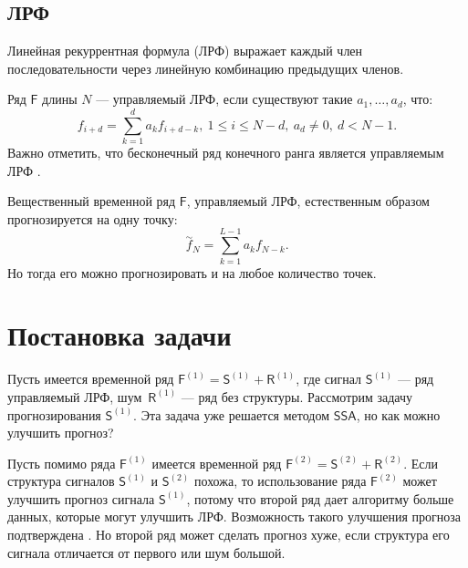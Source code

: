 \documentclass[specialist, substylefile = spbureport.rtx,
    subf,href,colorlinks=true, 12pt]{disser}
\newcommand{\F}{\mathsf{F}}
\newcommand{\sfS}{\mathsf{S}}
\newcommand{\sfR}{\mathsf{R}}
\newcommand{\SSA}{\mathsf{SSA}}
\begin{document}
    \section{ЛРФ}
        Линейная рекуррентная формула (ЛРФ) выражает каждый член последовательности через линейную комбинацию предыдущих членов.

        Ряд $\F$ длины $N$ --- управляемый ЛРФ, если существуют такие $a_1, \dotso, a_d$, что:
        $$f_{i+d} = \sum_{k=1}^d a_k f_{i+d-k},\ 1 \leq i \leq N - d,\ a_d \neq 0,\ d < N - 1.$$
        Важно отметить, что бесконечный ряд конечного ранга является управляемым ЛРФ \cite[раздел 2.1.2.2, стр. 35]{SSA_with_R}.
        
        

        Вещественный временной ряд $\F$, управляемый ЛРФ, естественным образом прогнозируется на одну точку:
        $$\overset{\sim}{f}_{N} = \sum_{k=1}^{L-1} a_k f_{N-k}.$$
        Но тогда его можно прогнозировать и на любое количество точек.




    \chapter{Постановка задачи}

        Пусть имеется временной ряд $\F^{(1)} = \sfS^{(1)} + \sfR^{(1)}$, где сигнал $\sfS^{(1)}$ --- ряд управляемый ЛРФ, шум~$\sfR^{(1)}$ --- ряд без структуры. Рассмотрим задачу прогнозирования $\sfS^{(1)}$. Эта задача уже решается методом $\SSA$, но как можно улучшить прогноз?

        Пусть помимо ряда $\F^{(1)}$ имеется временной ряд $\F^{(2)} = \sfS^{(2)} + \sfR^{(2)}$.
        Если структура сигналов $\sfS^{(1)}$ и $\sfS^{(2)}$ похожа, то использование ряда $\F^{(2)}$ может улучшить прогноз сигнала $\sfS^{(1)}$, потому что второй ряд дает алгоритму больше данных, которые могут улучшить ЛРФ.
        Возможность такого улучшения прогноза подтверждена \cite[4.3.3.3, стр. 216]{SSA_with_R}.
        Но второй ряд может сделать прогноз хуже, если структура его сигнала отличается от первого или шум большой.
\end{document}
